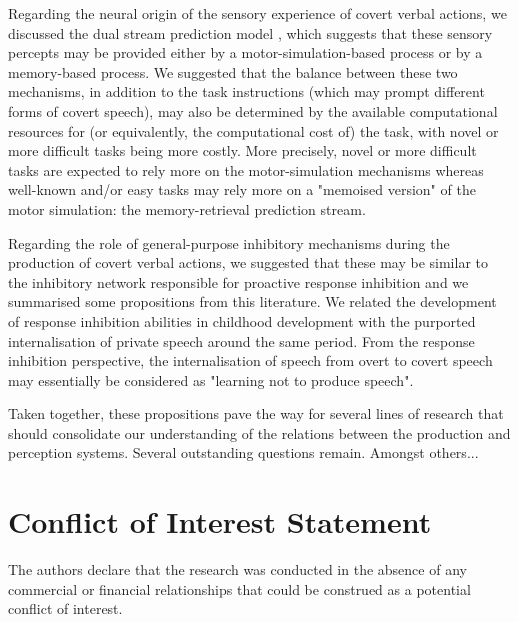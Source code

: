 \documentclass[utf8]{template/frontiersSCNS} %
\begin{document}
Regarding the neural origin of the sensory experience of covert verbal actions, we discussed the dual stream prediction model \citep{tian_mental_2012, tian_effect_2013, tian_mental_2016}, which suggests that these sensory percepts may be provided either by a motor-simulation-based process or by a memory-based process. We suggested that the balance between these two mechanisms, in addition to the task instructions (which may prompt different forms of covert speech), may also be determined by the available computational resources for (or equivalently, the computational cost of) the task, with novel or more difficult tasks being more costly. More precisely, novel or more difficult tasks are expected to rely more on the motor-simulation mechanisms whereas well-known and/or easy tasks may rely more on a "memoised version" of the motor simulation: the memory-retrieval prediction stream.

Regarding the role of general-purpose inhibitory mechanisms during the production of covert verbal actions, we suggested that these may be similar to the inhibitory network responsible for proactive response inhibition and we summarised some propositions from this literature. We related the development of response inhibition abilities in childhood development with the purported internalisation of private speech around the same period. From the response inhibition perspective, the internalisation of speech from overt to covert speech may essentially be considered as "learning not to produce speech".

Taken together, these propositions pave the way for several lines of research that should consolidate our understanding of the relations between the production and perception systems. Several outstanding questions remain. Amongst others...

\section*{Conflict of Interest Statement}


The authors declare that the research was conducted in the absence of any commercial or financial relationships that could be construed as a potential conflict of interest.
\end{document}

